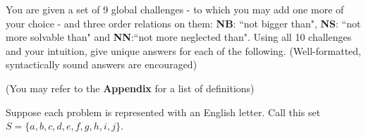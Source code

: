 \documentclass[addpoints]{exam}
\begin{document}
\begin{questions}
You are given a set of 9 global challenges - to which you may add one more of your choice - and three order relations on them: \textbf{NB}: ``not bigger than", \textbf{NS}: ``not more solvable than" and \textbf{NN}:``not more neglected than". Using all 10 challenges and your intuition, give unique answers for each of the following. (Well-formatted, syntactically sound answers are encouraged) 


(You may refer to the \textbf{Appendix} for a list of definitions)


  \begin{solution}
    Suppose each problem is represented with an English letter. Call this set \\
    $S = \{a, b, c, d, e, f, g, h, i, j\}.$
    
\end{solution}
\end{questions}
\end{document}
